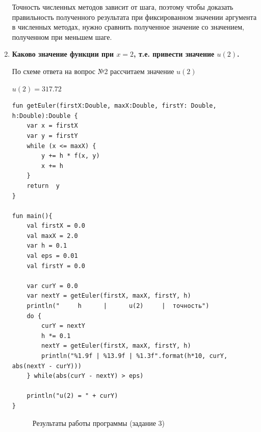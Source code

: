 \begin{enumerate}
     Точность численных методов зависит от шага, поэтому чтобы доказать правильность полученного результата при фиксированном значении аргумента в численных методах, нужно сравнить полученное значение со значением, полученном при меньшем шаге. 
    \item \textbf{Каково значение функции при $x=2$, т.е. привести значение $u(2)$.}
    
    По схеме ответа на вопрос №2 рассчитаем значение $u(2)$
    
    $u(2) = 317.72$
    \begin{lstlisting}
fun getEuler(firstX:Double, maxX:Double, firstY: Double, h:Double):Double {
    var x = firstX
    var y = firstY
    while (x <= maxX) {
        y += h * f(x, y)
        x += h
    }
    return  y
}

fun main(){
    val firstX = 0.0
    val maxX = 2.0
    var h = 0.1
    val eps = 0.01
    val firstY = 0.0

    var curY = 0.0
    var nextY = getEuler(firstX, maxX, firstY, h)
    println("     h      |      u(2)     |  точность")
    do {
        curY = nextY
        h *= 0.1
        nextY = getEuler(firstX, maxX, firstY, h)
        println("%1.9f | %13.9f | %1.3f".format(h*10, curY, abs(nextY - curY)))
    } while(abs(curY - nextY) > eps)

    println("u(2) = " + curY)
}
    \end{lstlisting}
     \begin{figure}[h!]
        \caption{Результаты работы программы (задание 3)}
    \end{figure}
\end{enumerate}



